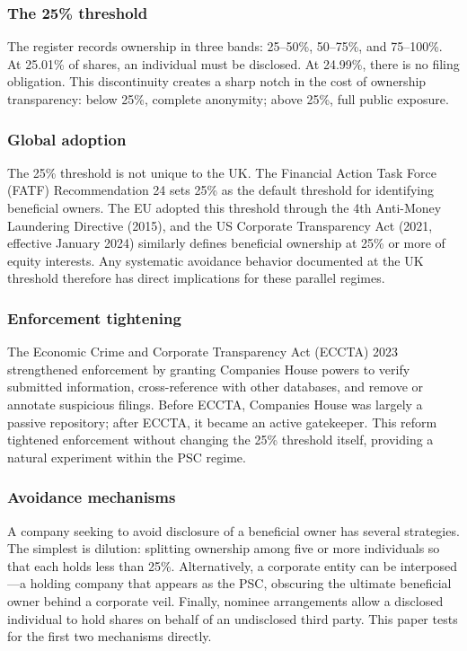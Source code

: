\documentclass[12pt]{article}
\begin{document}
\subsubsection*{The 25\% threshold} The register records ownership in three bands: 25--50\%, 50--75\%, and 75--100\%. At 25.01\% of shares, an individual must be disclosed. At 24.99\%, there is no filing obligation. This discontinuity creates a sharp notch in the cost of ownership transparency: below 25\%, complete anonymity; above 25\%, full public exposure.

\subsubsection*{Global adoption} The 25\% threshold is not unique to the UK. The Financial Action Task Force (FATF) Recommendation 24 sets 25\% as the default threshold for identifying beneficial owners. The EU adopted this threshold through the 4th Anti-Money Laundering Directive (2015), and the US Corporate Transparency Act (2021, effective January 2024) similarly defines beneficial ownership at 25\% or more of equity interests. Any systematic avoidance behavior documented at the UK threshold therefore has direct implications for these parallel regimes.

\subsubsection*{Enforcement tightening} The Economic Crime and Corporate Transparency Act (ECCTA) 2023 strengthened enforcement by granting Companies House powers to verify submitted information, cross-reference with other databases, and remove or annotate suspicious filings. Before ECCTA, Companies House was largely a passive repository; after ECCTA, it became an active gatekeeper. This reform tightened enforcement without changing the 25\% threshold itself, providing a natural experiment within the PSC regime.

\subsubsection*{Avoidance mechanisms} A company seeking to avoid disclosure of a beneficial owner has several strategies. The simplest is dilution: splitting ownership among five or more individuals so that each holds less than 25\%. Alternatively, a corporate entity can be interposed---a holding company that appears as the PSC, obscuring the ultimate beneficial owner behind a corporate veil. Finally, nominee arrangements allow a disclosed individual to hold shares on behalf of an undisclosed third party. This paper tests for the first two mechanisms directly.
\end{document}
